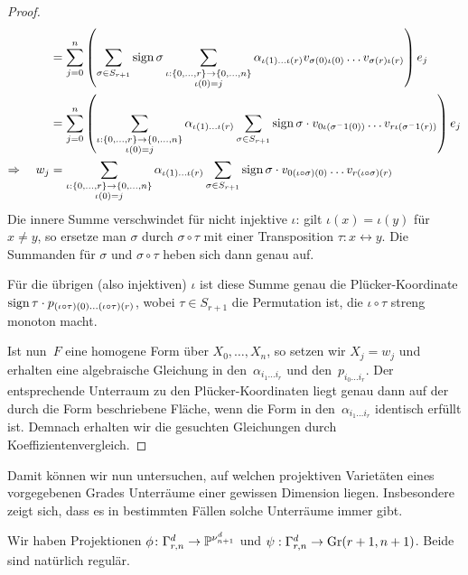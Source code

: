 \begin{proof}
\begin{align*}
	&= \sum_{j=0}^n \left(\sum\limits_{\sigma \in S_{r+1}} \operatorname{sign} \sigma \sum_{\substack{\iota: \{0, \dots, r\} \rightarrow \{0, \dots, n\} \\ \iota(0)=j }} \alpha_{\iota(1) \dots \iota(r)} v_{\sigma(0)\iota(0)} \dots v_{\sigma(r)\iota(r)}\right) e_j \\
	&= \sum_{j=0}^n \left(\sum_{\substack{\iota: \{0, \dots, r\} \rightarrow \{0, \dots, n\} \\ \iota(0)=j }} \alpha_{\iota(1) \dots \iota(r)} \sum\limits_{\sigma \in S_{r+1}} \operatorname{sign} \sigma \cdot v_{0\iota(\sigma^-1(0))} \dots v_{r\iota(\sigma^-1(r))}\right) e_j \\
\Rightarrow\quad w_j	&= \sum_{\substack{\iota: \{0, \dots, r\} \rightarrow \{0, \dots, n\} \\ \iota(0)=j }} \alpha_{\iota(1) \dots \iota(r)} \sum\limits_{\sigma \in S_{r+1}} \operatorname{sign} \sigma \cdot v_{0(\iota\circ\sigma)(0)} \dots v_{r(\iota\circ\sigma)(r)}
\end{align*}
Die innere Summe verschwindet für nicht injektive $\iota$: gilt $\iota(x) = \iota(y)$ für $x \neq y$, so ersetze man $\sigma$ durch $\sigma \circ \tau$ mit einer Transposition $\tau: x \leftrightarrow y$. Die Summanden für $\sigma$ und $\sigma \circ \tau$ heben sich dann genau auf.

Für die übrigen (also injektiven) $\iota$ ist diese Summe genau die Plücker-Koordinate $\operatorname{sign} \tau \cdot p_{(\iota\circ\tau)(0)\dots(\iota\circ\tau)(r)}$, wobei $\tau \in S_{r+1}$ die Permutation ist, die $\iota \circ \tau$ streng monoton macht.

Ist nun~$F$ eine homogene Form über $X_0, \dots, X_n$, so setzen wir $X_j = w_j$ und erhalten eine algebraische Gleichung in den~$\alpha_{i_1 \dots i_r}$ und den~$p_{i_0 \dots i_r}$. Der entsprechende Unterraum zu den Plücker-Koordinaten liegt genau dann auf der durch die Form beschriebene Fläche, wenn die Form in den~$\alpha_{i_1 \dots i_r}$ identisch erfüllt ist. Demnach erhalten wir die gesuchten Gleichungen durch Koeffizientenvergleich.
\end{proof}

Damit können wir nun untersuchen, auf welchen projektiven Varietäten eines vorgegebenen Grades Unterräume einer gewissen Dimension liegen. Insbesondere zeigt sich, dass es in bestimmten Fällen solche Unterräume immer gibt.

Wir haben Projektionen $\phi \colon \Gamma_{r,n}^d \rightarrow \mathbb P^{\nu_{n+1}^d}$ und $\psi: \Gamma_{r,n}^d \to \grass r+1/{n+1}$. Beide sind natürlich regulär.

